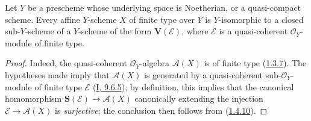 \begin{proposition}[1.7.15]
\label{II.1.7.15}
Let $Y$ be a prescheme whose underlying space is Noetherian, or a
quasi-compact scheme. Every affine $Y$-scheme $X$ of finite type over $Y$ is
$Y$-isomorphic to a closed sub-$Y$-scheme of a $Y$-scheme of the form
$\mathbf{V}(\mathcal{E})$, where $\mathcal{E}$ is a quasi-coherent
$\mathcal{O}_Y$-module of finite type.
\end{proposition}

\begin{proof}
Indeed, the quasi-coherent $\mathcal{O}_Y$-algebra $\mathcal{A}(X)$ is of
finite type (\hyperref[II.1.3.7]{1.3.7}). The hypotheses made imply
that $\mathcal{A}(X)$ is generated by a quasi-coherent
sub-$\mathcal{O}_Y$-module of finite type $\mathcal{E}$
(\hyperref[I.9.6.5]{I, 9.6.5}); by definition, this implies that
the canonical homomorphism
$\mathbf{S}(\mathcal{E})\to\mathcal{A}(X)$ canonically extending
the injection $\mathcal{E}\to\mathcal{A}(X)$ is \emph{surjective}; the
conclusion then follows from (\hyperref[II.1.4.10]{1.4.10}).
\end{proof}

